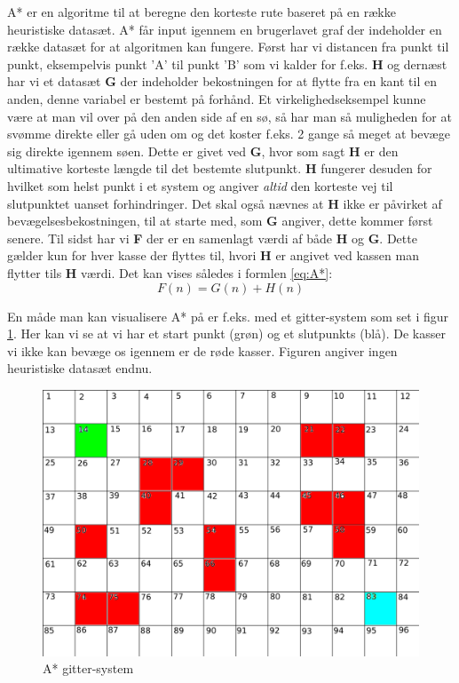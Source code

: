 \vspace{5mm}

A* er en algoritme til at beregne den korteste rute baseret på en række heuristiske datasæt. A* får input igennem en brugerlavet graf der indeholder en række datasæt for at algoritmen kan fungere.  Først har vi distancen fra punkt til punkt, eksempelvis punkt 'A' til punkt 'B' som vi kalder for f.eks. \textbf{H} og dernæst har vi et datasæt \textbf{G} der indeholder bekostningen for at flytte fra en kant til en anden, denne variabel er bestemt på forhånd. Et virkelighedseksempel kunne være at man vil over på den anden side af en sø, så har man så muligheden for at svømme direkte eller gå uden om og det koster f.eks. 2 gange så meget at bevæge sig direkte igennem søen. Dette er givet ved \textbf{G}, hvor som sagt \textbf{H} er den ultimative korteste længde til det bestemte slutpunkt. \textbf{H} fungerer desuden for hvilket som helst punkt i et system og angiver \textit{altid} den korteste vej til slutpunktet uanset forhindringer. Det skal også nævnes at \textbf{H} ikke er påvirket af bevægelsesbekostningen, til at starte med, som \textbf{G} angiver, dette kommer først senere. Til sidst har vi \textbf{F} der er en samenlagt værdi af både \textbf{H} og \textbf{G}. Dette gælder kun for hver kasse der flyttes til, hvori \textbf{H} er angivet ved kassen man flytter tils \textbf{H} værdi. Det kan vises således i formlen \ref{eq:A*}:
\begin{equation} \label{eq:A*}
F(n) = G(n) + H(n)
\end{equation}

En måde man kan visualisere A* på er f.eks. med et gitter-system som set i figur \ref{fig:AKvadrat1}. Her kan vi se at vi har et start punkt (grøn) og et slutpunkts (blå). De kasser vi ikke kan bevæge os igennem er de røde kasser. Figuren angiver ingen heuristiske datasæt endnu.

\begin{figure}[H]
\begin{adjustbox}{width=1.2\textwidth,center=\textwidth}
\centering
\includegraphics[width=1.2\textwidth]{Pictures/Teoriafsnit/Figurfiler/Grid2.png}
\end{adjustbox}
\caption{A* gitter-system}
\label{fig:AKvadrat1}
\end{figure}

